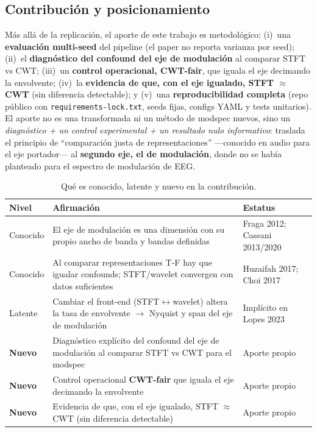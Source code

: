 \documentclass[11pt, a4paper]{article}
\begin{document}
\subsection{Contribución y posicionamiento}
\label{sec:contribucion}

Más allá de la replicación, el aporte de este trabajo es metodológico:
(i)~una \textbf{evaluación multi-seed} del pipeline (el paper no reporta
varianza por seed); (ii)~el \textbf{diagnóstico del confound del eje de
modulación} al comparar STFT vs CWT; (iii)~un \textbf{control operacional,
CWT-fair}, que iguala el eje decimando la envolvente; (iv)~la
\textbf{evidencia de que, con el eje igualado, STFT $\approx$ CWT} (sin
diferencia detectable); y (v)~una \textbf{reproducibilidad completa} (repo
público con \texttt{requirements-lock.txt}, seeds fijas, configs YAML y
tests unitarios). El aporte no es una transformada ni un método de
modspec nuevos, sino un \emph{diagnóstico + un control experimental + un
resultado nulo informativo}: traslada el principio de ``comparación justa
de representaciones'' ---conocido en audio para el eje portador--- al
\textbf{segundo eje, el de modulación}, donde no se había planteado para el
espectro de modulación de EEG.

\begin{table}[H]
\centering
\small
\begin{tabular}{p{2.1cm}p{8.5cm}p{2.6cm}}
\toprule
Nivel & Afirmación & Estatus \\
\midrule
Conocido & El eje de modulación es una dimensión con su propio ancho de banda y bandas definidas & Fraga 2012; Cassani 2013/2020 \\
Conocido & Al comparar representaciones T-F hay que igualar confounds; STFT/wavelet convergen con datos suficientes & Huzaifah 2017; Choi 2017 \\
Latente & Cambiar el front-end (STFT$\leftrightarrow$wavelet) altera la tasa de envolvente $\to$ Nyquist y span del eje de modulación & Implícito en Lopes 2023 \\
\textbf{Nuevo} & Diagnóstico explícito del confound del eje de modulación al comparar STFT vs CWT para el modspec & Aporte propio \\
\textbf{Nuevo} & Control operacional \textbf{CWT-fair} que iguala el eje decimando la envolvente & Aporte propio \\
\textbf{Nuevo} & Evidencia de que, con el eje igualado, STFT $\approx$ CWT (sin diferencia detectable) & Aporte propio \\
\bottomrule
\end{tabular}
\caption{Qué es conocido, latente y nuevo en la contribución.}
\end{table}
\end{document}
